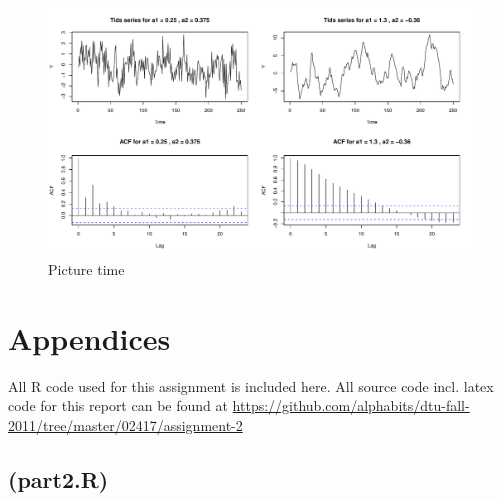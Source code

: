 \begin{figure}
    \centering
    \includegraphics[width=140mm]{ar2-sim-1.pdf}
    \caption{Picture time}
    \label{fig:one}
\end{figure}

\pagebreak

\section*{Appendices}
All R code used for this assignment is included here. All source code incl. latex code for this report can be found at {\small\url{https://github.com/alphabits/dtu-fall-2011/tree/master/02417/assignment-2}}
\subsection*{(part2.R)}





